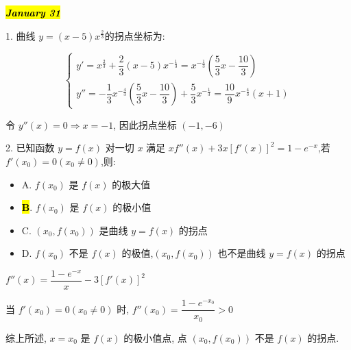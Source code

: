 \hl{\textbf{\textit{January 31}}}

1. 曲线 $y=(x-5)x^{\frac{2}{3}}$的拐点坐标为:
\begin{solution}

	$$\begin{cases}
		y' = x^{\frac{2}{3}}+\dfrac{2}{3}(x-5)x^{-\frac{1}{3}} = x^{-\frac{1}{3}}(\dfrac{5}{3}x-\dfrac{10}{3})\\
		y''= -\dfrac{1}{3}x^{-\frac{4}{3}}(\dfrac{5}{3}x-\dfrac{10}{3})+\dfrac{5}{3}x^{-\frac{1}{3}} = \dfrac{10}{9}x^{-\frac{4}{3}}(x+1) 
	\end{cases}$$

	令 $y''(x) = 0\Rightarrow x =-1$, 因此拐点坐标 $(-1,-6)$
\end{solution}

2. 已知函数 $y=f(x)$ 对一切 $x$ 满足 $xf''(x)+3x[f'(x)]^{2}=1-e^{-x}$,若 $f'(x_{0})=0(x_{0}\neq 0)$,则:
\begin{itemize}
	\item A. $f(x_{0})$ 是 $f(x)$ 的极大值
	\item \hl{\textbf{B}}. $f(x_{0})$ 是 $f(x)$ 的极小值
	\item C. $(x_{0},f(x_{0}))$ 是曲线 $y=f(x)$ 的拐点
	\item D. $f(x_{0})$ 不是 $f(x)$ 的极值,$(x_{0},f(x_{0}))$ 也不是曲线 $y=f(x)$ 的拐点
\end{itemize}
\begin{solution}

	$f''(x) = \dfrac{1-e^{-x}}{x} -3[f'(x)]^{2}$

	当 $f'(x_{0}) = 0(x_{0}\neq 0)$ 时, $f''(x_{0}) = \dfrac{1-e^{-x_{0}}}{x_{0}} > 0$

	综上所述, $x = x_{0}$ 是 $f(x)$ 的极小值点, 点 $(x_{0},f(x_{0}))$ 不是 $f(x)$ 的拐点.
\end{solution}

